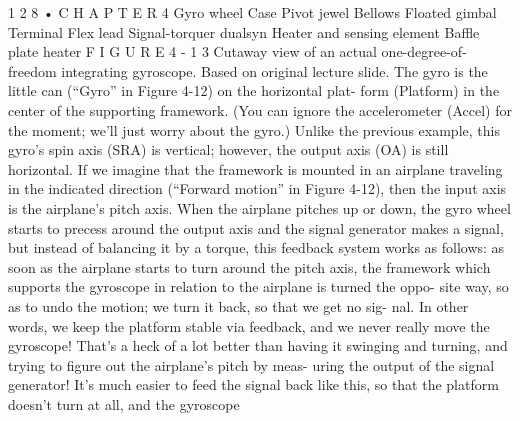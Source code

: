 \documentclass[10pt,oneside]{article}
\begin{document}
1 2 8 • C H A P T E R  4 Gyro wheel Case Pivot jewel Bellows Floated gimbal Terminal Flex lead Signal-torquer dualsyn Heater and sensing element Baffle plate heater F I G U R E  4 - 1 3 Cutaway view of an actual one-degree-of-freedom integrating gyroscope. Based on original lecture slide. The gyro is the little can (“Gyro” in Figure 4-12) on the horizontal plat- form (Platform) in the center of the supporting framework. (You can ignore the accelerometer (Accel) for the moment; we’ll just worry about the gyro.) Unlike the previous example, this gyro’s spin axis (SRA) is vertical; however, the output axis (OA) is still horizontal. If we imagine that the framework is mounted in an airplane traveling in the indicated direction (“Forward motion” in Figure 4-12), then the input axis is the airplane’s pitch axis. When the airplane pitches up or down, the gyro wheel starts to precess around the output axis and the signal generator makes a signal, but instead of balancing it by a torque, this feedback system works as follows: as soon as the airplane starts to turn around the pitch axis, the framework which supports the gyroscope in relation to the airplane is turned the oppo- site way, so as to undo the motion; we turn it back, so that we get no sig- nal. In other words, we keep the platform stable via feedback, and we never really move the gyroscope! That’s a heck of a lot better than having it swinging and turning, and trying to figure out the airplane’s pitch by meas- uring the output of the signal generator! It’s much easier to feed the signal back like this, so that the platform doesn’t turn at all, and the gyroscope\par
\end{document}

